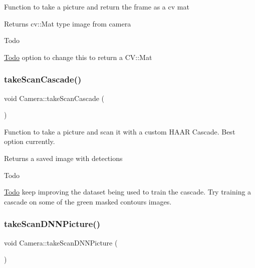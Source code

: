 Function to take a picture and return the frame as a cv mat

\begin{DoxyReturn}{Returns}
cv\+::\+Mat type image from camera
\end{DoxyReturn}
\begin{DoxyRefDesc}{Todo}
\item[\hyperlink{todo__todo000003}{Todo}]option to change this to return a C\+V\+::\+Mat \end{DoxyRefDesc}
\mbox{\label{classCamera_a09931f84cc8e66e4e4c1181cb1cb4af6}} 
\subsubsection{\texorpdfstring{take\+Scan\+Cascade()}{takeScanCascade()}}
{\footnotesize\ttfamily void Camera\+::take\+Scan\+Cascade (\begin{DoxyParamCaption}{ }\end{DoxyParamCaption})}

Function to take a picture and scan it with a custom H\+A\+AR Cascade. Best option currently.

\begin{DoxyReturn}{Returns}
a saved image with detections
\end{DoxyReturn}
\begin{DoxyRefDesc}{Todo}
\item[\hyperlink{todo__todo000005}{Todo}]keep improving the dataset being used to train the cascade. Try training a cascade on some of the green masked contours images. \end{DoxyRefDesc}
\mbox{\label{classCamera_a59f08842d3de300419c74b12bee44d47}} 
\subsubsection{\texorpdfstring{take\+Scan\+D\+N\+N\+Picture()}{takeScanDNNPicture()}}
{\footnotesize\ttfamily void Camera\+::take\+Scan\+D\+N\+N\+Picture (\begin{DoxyParamCaption}{ }\end{DoxyParamCaption})}

